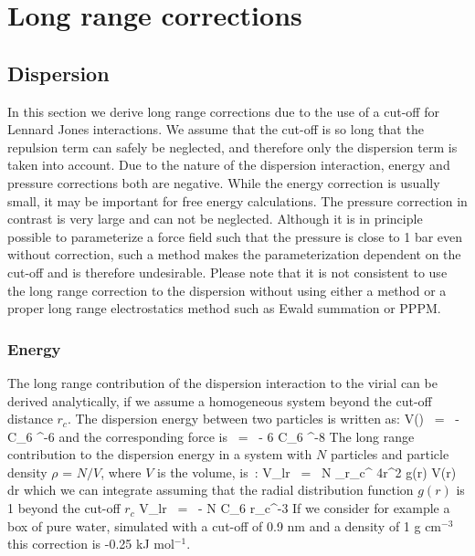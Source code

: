 %
% 
% 
% 
% 
% 
% 
% 
% 
%

\newcommand{\dr}{{\rm d}r}
\newcommand{\avcsix}{\left< C_6 \right>}
\chapter{Long range corrections}
\label{ch:lrcorr}
\section{Dispersion}
In this section we derive long range corrections due to the use of a
cut-off for Lennard Jones interactions.  We assume that the cut-off is
so long that the repulsion term can safely be neglected, and therefore
only the dispersion term is taken into account. Due to the nature of
the dispersion interaction, energy and pressure corrections both are
negative. While the energy correction is usually small, it may be
important for free energy calculations. The pressure correction in
contrast is very large and can not be neglected. Although it is in
principle possible to parameterize a force field such that the pressure
is close to 1 bar even without correction, such a method makes the
parameterization dependent on the cut-off and is therefore
undesirable. Please note that it is not consistent to use the long
range correction to the dispersion without using either a
 method or a proper long range
electrostatics method such as Ewald summation or PPPM.

\subsection{Energy}
\label{sec:ecorr}
The long range contribution of the dispersion interaction to the
virial can be derived analytically, if we assume a homogeneous
system beyond the cut-off distance $r_c$. The dispersion energy
between two particles is written as:
\beq
V(\rij)	~=~	- C_6 \rij^{-6}
\eeq
and the corresponding force is
\beq
\Fvij	~=~	- 6 C_6 \rij^{-8}\rvij
\eeq
The long range contribution to the dispersion energy
in a system with $N$ particles and particle density
$\rho$ = $N/V$, where $V$ is the volume, is~\cite{Allen87}:
\beq
V_{lr}  ~=~ \half N \rho\int_{r_c}^{\infty}   4\pi r^2 g(r) V(r) {\dr}
\eeq
which we can integrate assuming that the radial distribution function $g(r)$ 
is 1 beyond the cut-off $r_c$
\beq
V_{lr}	~=~ - N \rho\pi C_6 r_c^{-3}
\eeq
If we consider for example a box of pure water, simulated with a cut-off
of 0.9 nm and a density of 1 g cm$^{-3}$ this correction is 
-0.25 kJ mol$^{-1}$.

